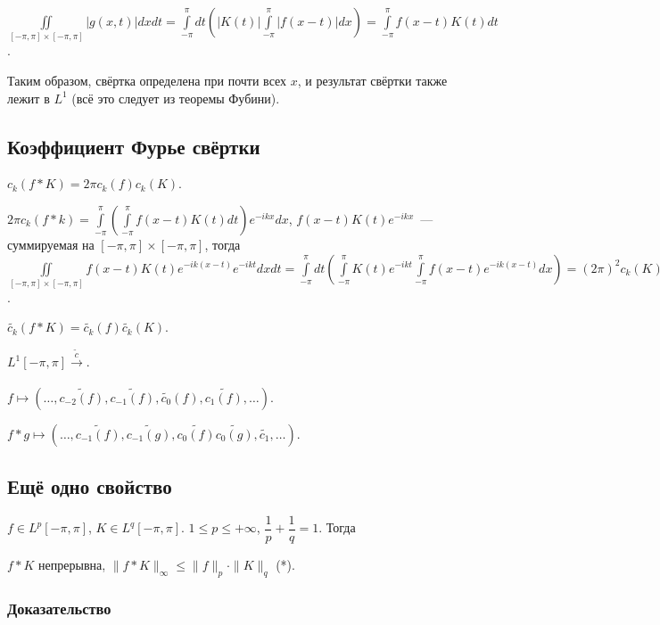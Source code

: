 \documentclass{article}
\begin{document}
        $\iint\limits_{[-\pi, \pi] \times [-\pi, \pi]} | g(x, t) | dx dt = \int\limits^{\pi}_{-\pi} dt \left( | K(t) | \int\limits^{\pi}_{-\pi} | f(x - t) | dx \right) = \int\limits^{\pi}_{-\pi} f(x - t) K(t) dt$.
        
        Таким образом, свёртка определена при почти всех $x$, и результат свёртки также лежит в $L^1$ (всё это следует из теоремы Фубини).
        
    \subsection{Коэффициент Фурье свёртки}
    
        $c_k(f * K) = 2 \pi c_k(f) c_k(K)$.
        
        $2 \pi c_k(f * k) = \int\limits^{\pi}_{-\pi} \left( \int\limits^{\pi}_{-\pi} f(x - t) K(t) dt \right) e^{-ikx} dx$, $f(x - t) K(t) e^{-ikx}$~--- суммируемая на $[-\pi, \pi] \times [-\pi, \pi]$, тогда $\iint\limits_{[-\pi, \pi] \times [-\pi, \pi]} f(x - t) K(t) e^{-ik(x - t)} e^{-ikt} dx dt = \int\limits^{\pi}_{-\pi} dt \left( \int\limits^{\pi}_{-\pi} K(t) e^{-ikt} \int\limits^{\pi}_{-\pi} f(x - t) e^{-ik(x - t)} dx \right) = (2 \pi)^2 c_k(K) c_k(f)$.
        
        $\widetilde{c_k} (f * K) = \widetilde{c_k} (f) \widetilde{c_k} (K)$.
        
        $L^1[-\pi, \pi] \xrightarrow[]{\widetilde{c}}$.
        
        $f \mapsto ( \ldots, \widetilde{c_{-2}(f)}, \widetilde{c_{-1}(f)}, \widetilde{c_0}(f), \widetilde{c_1(f)}, \ldots )$.
        
        $f * g \mapsto ( \ldots, \widetilde{c_{-1}(f)}, \widetilde{c_{-1}(g)}, \widetilde{c_0(f)} \widetilde{c_0(g)}, \widetilde{c_1}, \ldots )$.
        
    \subsection{Ещё одно свойство}
    
        $f \in L^p [-\pi, \pi]$, $K \in L^q [-\pi, \pi]$. $1 \leqslant p \leqslant +\infty$, $\dfrac{1}{p} + \dfrac{1}{q} = 1$. Тогда
        
        $f * K$ непрерывна, $\| f * K \|_{\infty} \leqslant \| f \|_p \cdot \| K \|_q$ (*).
        
        \subsubsection{Доказательство}
        
\end{document}
